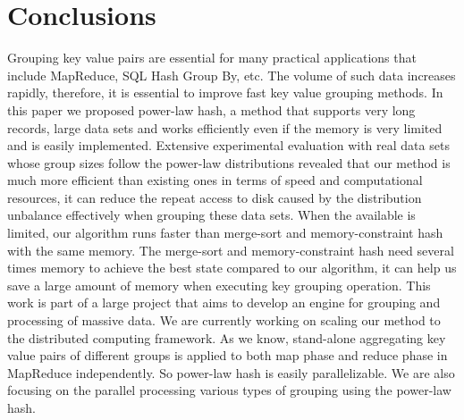 \section{Conclusions}

Grouping key value pairs are essential for many practical applications that include MapReduce, SQL Hash Group By, etc. The volume of such data increases rapidly, therefore, it is essential to improve fast key value grouping methods. In this paper we proposed power-law hash, a method that supports very long records, large data sets and works efficiently even if the memory is very limited and is easily implemented. Extensive experimental evaluation with real data sets whose group sizes follow the power-law distributions revealed that our method is much more efficient than existing ones in terms of speed and computational resources, it can reduce the repeat access to disk caused by the distribution unbalance effectively when grouping these data sets. When the available is limited, our algorithm runs faster than merge-sort and memory-constraint hash with the same memory. The merge-sort and memory-constraint hash need several times memory to achieve the best state compared to our algorithm, it can help us save a large amount of memory when executing key grouping operation. This work is part of a large project that aims to develop an engine for grouping and processing of massive data. We are currently working on scaling our method to the distributed computing framework. As we know, stand-alone aggregating key value pairs of different groups is applied to both map phase and reduce phase in MapReduce independently. So power-law hash is easily parallelizable. We are also focusing on the parallel processing various types of grouping using the power-law hash.

